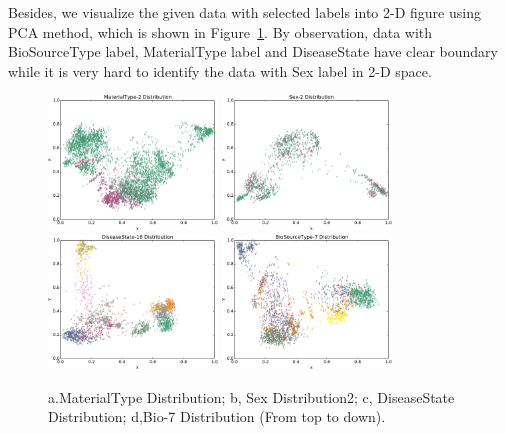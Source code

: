 \documentclass[sigconf]{acmart}
\begin{document}
	
	Besides, we visualize the given data with selected labels into 2-D figure using PCA method, which is shown in Figure~\ref{distribution_1}. By observation, data with BioSourceType label, MaterialType label and DiseaseState have clear boundary while it is very hard to identify the data with Sex label in 2-D space.

	\begin{figure}[]
		\centering
		\includegraphics[width=0.4\textwidth]{../figs/Material-2.pdf}
		\includegraphics[width=0.4\textwidth]{../figs/Sex-2.pdf}
		\includegraphics[width=0.4\textwidth]{../figs/Disease-16.pdf}
		\includegraphics[width=0.4\textwidth]{../figs/Bio-7.pdf}
		\caption{a.MaterialType Distribution;  b, Sex Distribution2; c, DiseaseState Distribution; d,Bio-7 Distribution (From top to down). }
		\label{distribution_1}
		\centering
	\end{figure}
	
\end{document}
